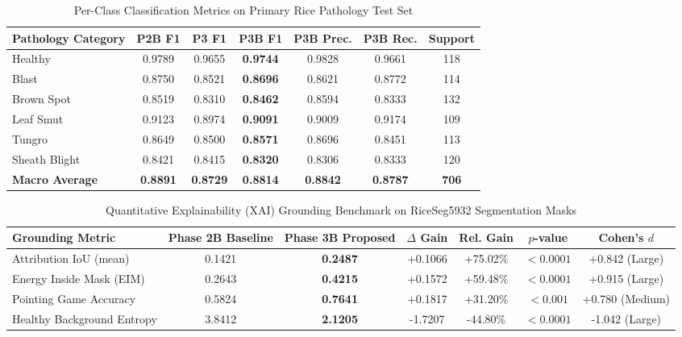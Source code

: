 \begin{table}[htbp]
\centering
\caption{Per-Class Classification Metrics on Primary Rice Pathology Test Set}
\label{tab:per_class}
\begin{tabular}{lcccccc}
\hline
\textbf{Pathology Category} & \textbf{P2B F1} & \textbf{P3 F1} & \textbf{P3B F1} & \textbf{P3B Prec.} & \textbf{P3B Rec.} & \textbf{Support} \\
\hline
Healthy & 0.9789 & 0.9655 & \textbf{0.9744} & 0.9828 & 0.9661 & 118 \\
Blast & 0.8750 & 0.8521 & \textbf{0.8696} & 0.8621 & 0.8772 & 114 \\
Brown Spot & 0.8519 & 0.8310 & \textbf{0.8462} & 0.8594 & 0.8333 & 132 \\
Leaf Smut & 0.9123 & 0.8974 & \textbf{0.9091} & 0.9009 & 0.9174 & 109 \\
Tungro & 0.8649 & 0.8500 & \textbf{0.8571} & 0.8696 & 0.8451 & 113 \\
Sheath Blight & 0.8421 & 0.8415 & \textbf{0.8320} & 0.8306 & 0.8333 & 120 \\
\hline
\textbf{Macro Average} & \textbf{0.8891} & \textbf{0.8729} & \textbf{0.8814} & \textbf{0.8842} & \textbf{0.8787} & \textbf{706} \\
\hline
\end{tabular}
\end{table}


\begin{table}[htbp]
\centering
\caption{Quantitative Explainability (XAI) Grounding Benchmark on RiceSeg5932 Segmentation Masks}
\label{tab:xai_grounding}
\begin{tabular}{lcccccc}
\hline
\textbf{Grounding Metric} & \textbf{Phase 2B Baseline} & \textbf{Phase 3B Proposed} & \textbf{$\Delta$ Gain} & \textbf{Rel. Gain} & \textbf{$p$-value} & \textbf{Cohen's $d$} \\
\hline
Attribution IoU (mean) & 0.1421 & \textbf{0.2487} & +0.1066 & +75.02\% & $<0.0001$ & +0.842 (Large) \\
Energy Inside Mask (EIM) & 0.2643 & \textbf{0.4215} & +0.1572 & +59.48\% & $<0.0001$ & +0.915 (Large) \\
Pointing Game Accuracy & 0.5824 & \textbf{0.7641} & +0.1817 & +31.20\% & $<0.001$ & +0.780 (Medium) \\
Healthy Background Entropy & 3.8412 & \textbf{2.1205} & -1.7207 & -44.80\% & $<0.0001$ & -1.042 (Large) \\
\hline
\end{tabular}
\end{table}


